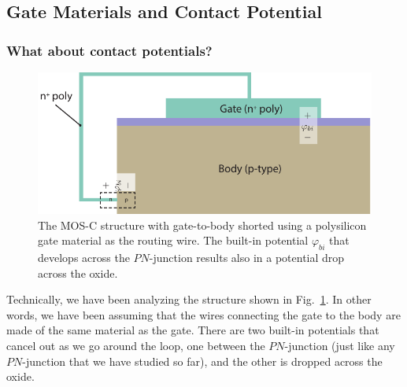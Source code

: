 \subsection{Gate Materials and Contact Potential}
\subsubsection{What about contact potentials?}
\begin{figure}[tbh]
\centering
\includegraphics[width=.75\columnwidth]{mos_cap_short_phibi}
\caption{The MOS-C structure with gate-to-body shorted using a polysilicon gate material as the routing wire.  The built-in potential $\varphi_{bi}$ that develops across the $PN$-junction results also in a  potential drop across the oxide.}
\label{fig:mos_cap_gate_body_short_gate}
\end{figure}
Technically, we have been analyzing the structure shown in Fig.~\ref{fig:mos_cap_gate_body_short_gate}.  In other words, we have been assuming that the wires connecting the gate to the body are made of the same material as the gate.  There are two built-in potentials that cancel out as we go around the loop, one between the $PN$-junction (just like any $PN$-junction that we have studied so far), and the other is dropped across the oxide.  
